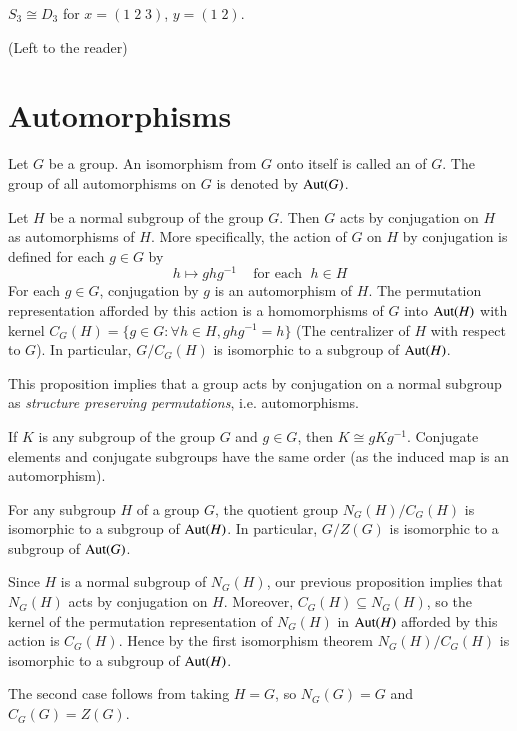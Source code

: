 \documentclass[12pt, a4paper, twoside, openright, titlepage]{book}
\begin{document}
\begin{cor}{}{}
    $S_3 \cong D_3$ for $x = (1\;2\;3)$, $y = (1\;2)$.
    \begin{proof*}{}{}
        (Left to the reader)
    \end{proof*}
\end{cor}



\section{\textsection Automorphisms}

\begin{defn}{}{}
    Let $G$ be a group. An isomorphism from $G$ onto itself is called an  of $G$. The group of all automorphisms on $G$ is denoted by $\operatorname{Aut}(G)$.
\end{defn}


\begin{prop}{}{}
    Let $H$ be a normal subgroup of the group $G$. Then $G$ acts by conjugation on $H$ as automorphisms of $H$. More specifically, the action of $G$ on $H$ by conjugation is defined for each $g \in G$ by \begin{equation*}
        h\mapsto ghg^{-1}\;\;\;\text{ for each }\;h\in H
    \end{equation*}
    For each $g \in G$, conjugation by $g$ is an automorphism of $H$. The permutation representation afforded by this action is a homomorphisms of $G$ into $\operatorname{Aut}(H)$ with kernel $C_G(H) = \{g \in G:\forall h\in H, ghg^{-1} =h\}$ (The centralizer of $H$ with respect to $G$). In particular, $G/C_G(H)$ is isomorphic to a subgroup of $\operatorname{Aut}(H)$.
\end{prop}

\begin{rmk}{}{}
    This proposition implies that a group acts by conjugation on a normal subgroup as \emph{structure preserving permutations}, i.e. automorphisms.
\end{rmk}

\begin{cor}{}{}
    If $K$ is any subgroup of the group $G$ and $g \in G$, then $K \cong gKg^{-1}$. Conjugate elements and conjugate subgroups have the same order (as the induced map is an automorphism).
\end{cor}


\begin{cor}{}{}
    For any subgroup $H$ of a group $G$, the quotient group $N_G(H)/C_G(H)$ is isomorphic to a subgroup of $\operatorname{Aut}(H)$. In particular, $G/Z(G)$ is isomorphic to a subgroup of $\operatorname{Aut}(G)$.
\end{cor}
\begin{proof*}{}{}
    Since $H$ is a normal subgroup of $N_G(H)$, our previous proposition implies that $N_G(H)$ acts by conjugation on $H$. Moreover, $C_G(H) \subseteq N_G(H)$, so the kernel of the permutation representation of $N_G(H)$ in $\operatorname{Aut}(H)$ afforded by this action is $C_G(H)$. Hence by the first isomorphism theorem $N_G(H)/C_G(H)$ is isomorphic to a subgroup of $\operatorname{Aut}(H)$.

    The second case follows from taking $H = G$, so $N_G(G) = G$ and $C_G(G) = Z(G)$.
\end{proof*}
\end{document}
